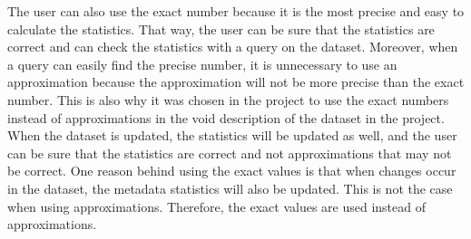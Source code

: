 The user can also use the exact number because it is the most precise and easy to calculate the statistics. That way, the user can be sure that the statistics are correct and can check the statistics with a query on the dataset. Moreover, when a query can easily find the precise number, it is unnecessary to use an approximation because the approximation will not be more precise than the exact number.
This is also why it was chosen in the project to use the exact numbers instead of approximations in the  \gls{void} description of the dataset in the project. When the dataset is updated, the statistics will be updated as well, and the user can be sure that the statistics are correct and not approximations that may not be correct. One reason behind using the exact values is that when changes occur in the dataset, the metadata statistics will also be updated. This is not the case when using approximations. Therefore, the exact values are used instead of approximations.




